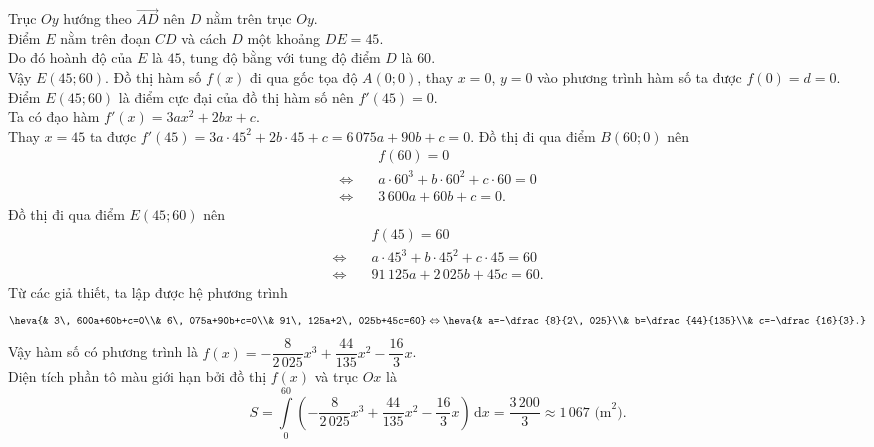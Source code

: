 \begin{ex}
{\begin{center}
		\end{center}
		\begin{itemchoice}
			\itemch Trục $Oy$ hướng theo $\overrightarrow{AD}$ nên $D$ nằm trên trục $Oy$. \\
			Điểm $E$ nằm trên đoạn $CD$ và cách $D$ một khoảng $DE=45$. \\
			Do đó hoành độ của $E$ là $45$, tung độ bằng với tung độ điểm $D$ là $60$. \\
			Vậy $E(45; 60)$.
			\itemch Đồ thị hàm số $f(x)$ đi qua gốc tọa độ $A(0; 0)$, thay $x=0$, $y=0$ vào phương trình hàm số ta được $f(0)=d=0$.
			\itemch Điểm $E(45; 60)$ là điểm cực đại của đồ thị hàm số nên $f'(45)=0$. \\
			Ta có đạo hàm $f'(x)=3ax^2+2bx+c$. \\
			Thay $x=45$ ta được $f'(45)=3a\cdot 45^2+2b\cdot 45+c=6\, 075a+90b+c=0$.
			\itemch Đồ thị đi qua điểm $B(60; 0)$ nên
			\begin{align*}
				&f(60)=0\\
				\Leftrightarrow \quad &a\cdot 60^3+b\cdot 60^2+c\cdot 60=0\\
				\Leftrightarrow \quad &3\, 600a+60b+c=0.
			\end{align*}
			Đồ thị đi qua điểm $E(45; 60)$ nên
			\begin{align*}
				&f(45)=60\\
				\Leftrightarrow \quad &a\cdot 45^3+b\cdot 45^2+c\cdot 45=60\\
				\Leftrightarrow \quad &91\, 125a+2\, 025b+45c=60.
			\end{align*}
			Từ các giả thiết, ta lập được hệ phương trình
			\[\heva{& 3\, 600a+60b+c=0\\& 6\, 075a+90b+c=0\\& 91\, 125a+2\, 025b+45c=60}\Leftrightarrow\heva{& a=-\dfrac{8}{2\, 025}\\& b=\dfrac{44}{135}\\& c=-\dfrac{16}{3}.}\]
			Vậy hàm số có phương trình là $f(x)=-\dfrac{8}{2\, 025}x^3+\dfrac{44}{135}x^2-\dfrac{16}{3}x$. \\
			Diện tích phần tô màu giới hạn bởi đồ thị $f(x)$ và trục $Ox$ là
			\[S=\displaystyle\int\limits_{0}^{60}\left(-\dfrac{8}{2\, 025}x^3+\dfrac{44}{135}x^2-\dfrac{16}{3}x\right)\mathrm{\,d}x=\dfrac{3\, 200}{3}\approx 1\, 067\text{ (m}^2\text{)}. \]
		\end{itemchoice}
	}
\end{ex}

